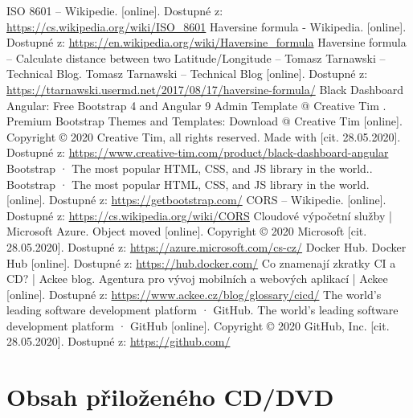 \documentclass[
  glossaries,
]{kidiplom}
\begin{document}
\begin{thebibliography}{9}
     ISO 8601 – Wikipedie. [online]. Dostupné z: \url{https://cs.wikipedia.org/wiki/ISO\_8601}
     Haversine formula - Wikipedia. [online]. Dostupné z: \url{https://en.wikipedia.org/wiki/Haversine\_formula}
     Haversine formula – Calculate distance between two Latitude/Longitude – Tomasz Tarnawski – Technical Blog. Tomasz Tarnawski – Technical Blog [online]. Dostupné z: \url{https://ttarnawski.usermd.net/2017/08/17/haversine-formula/}
     Black Dashboard Angular: Free Bootstrap 4 and Angular 9 Admin Template @ Creative Tim . Premium Bootstrap Themes and Templates: Download @ Creative Tim [online]. Copyright © 2020 Creative Tim, all rights reserved. Made with [cit. 28.05.2020]. Dostupné z:  \url{https://www.creative-tim.com/product/black-dashboard-angular}
     Bootstrap · The most popular HTML, CSS, and JS library in the world.. Bootstrap · The most popular HTML, CSS, and JS library in the world. [online]. Dostupné z: \url{https://getbootstrap.com/}
     CORS – Wikipedie. [online]. Dostupné z:  \url{https://cs.wikipedia.org/wiki/CORS}
     Cloudové výpočetní služby | Microsoft Azure. Object moved [online]. Copyright © 2020 Microsoft [cit. 28.05.2020]. Dostupné z: \url{https://azure.microsoft.com/cs-cz/}
     Docker Hub. Docker Hub [online]. Dostupné z: \url{https://hub.docker.com/}
     Co znamenají zkratky CI a CD? | Ackee blog. Agentura pro vývoj mobilních a webových aplikací | Ackee [online]. Dostupné z: \url{https://www.ackee.cz/blog/glossary/cicd/}
     The world’s leading software development platform · GitHub. The world’s leading software development platform · GitHub [online]. Copyright © 2020 GitHub, Inc. [cit. 28.05.2020]. Dostupné z: \url{https://github.com/}
\end{thebibliography}

\newpage

\section{Obsah přiloženého CD/DVD} \label{sec:ObsahCD}
\end{document}
